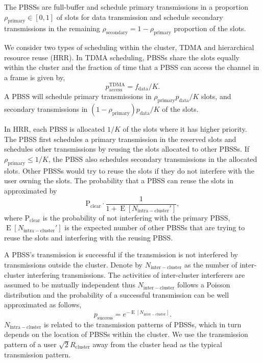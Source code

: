 \documentclass[10pt, conference, letterpaper]{IEEEtran}
\DeclareMathOperator*{\E}{\mathrm{E}}
\begin{document}
The PBSSs are full-buffer and schedule primary transmissions in a proportion $\rho_{\mathrm{primary}}\in[0,1]$ of slots for data transmission and schedule secondary transmissions in the remaining $\rho_{\mathrm{secondary}} =1 - \rho_{\mathrm{primary}}$ proportion of the slots. 

We consider two types of scheduling within the cluster, TDMA and hierarchical resource reuse (HRR). In TDMA scheduling, PBSSs share the slots equally within the cluster and the fraction of time that a PBSS can access the channel in a frame is given by, 
\begin{equation*}
p_{\mathrm{access}}^{\mathrm{TDMA}} = f_{\mathrm{data}}/K.
\end{equation*}
A PBSS will schedule primary transmissions in $\rho_{\mathrm{primary}}p_{\mathrm{data}}/K$ slots, and secondary transmissions in $(1-\rho_{\mathrm{primary}})p_{\mathrm{data}}/K$ of the slots. 

In HRR, each PBSS is allocated $1/K$ of the slots where it has higher priority. 
The PBSS first schedules a primary transmission in the reserved slots and schedules other transmissions by reusing the slots allocated to other PBSSs. 
If $\rho_{\mathrm{primary}}\leq 1/K$, the PBSS also schedules secondary transmissions in the allocated slots. 
Other PBSSs would try to reuse the slots if they do not interfere with the user owning the slots.
The probability that a PBSS can reuse the slots in approximated by
\begin{equation*}
\mathrm{P}_{\mathrm{clear}}\cdot \frac{1}{1+\E[N_{\mathrm{intra-cluster}}']},
\end{equation*}
where $\mathrm{P}_{\mathrm{clear}}$ is the probability of not interfering with the primary PBSS, $\E[N_{\mathrm{intra-cluster}}']$ is the expected number of other PBSSs that are trying to reuse the slots and interfering with the reusing PBSS.

A PBSS's transmission is successful if the transmission is not interfered by transmissions outside the cluster. 
Denote by $N_{\mathrm{inter-cluster}}$ as the number of inter-cluster interfering transmissions. 
The activities of inter-cluster interferers are assumed to be mutually independent thus $N_{\mathrm{inter-cluster}}$ follows a Poisson distribution and the probability of a successful transmission can be well approximated as follows, 
\begin{equation*}
p_{\mathrm{success}} = e^{-\E[N_{\mathrm{inter-cluster}}]}.
\end{equation*} 
$N_{\mathrm{intra-cluster}}$ is related to the transmission patterns of PBSSs, which in turn depends on the location of PBSSs within the cluster. 
We use the transmission pattern of a user $\sqrt{2}R_{\mathrm{cluster}}$ away from the cluster head as the typical transmission pattern.
\end{document}
